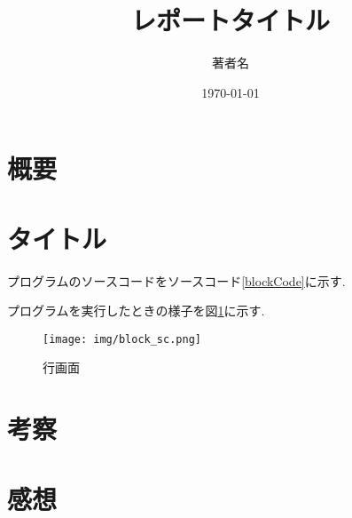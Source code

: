 \documentclass[mingoth]{jsarticle}
\title{レポートタイトル}
\author{著者名}
\date{\today}
\begin{document}
\maketitle

\section{概要}

\section{タイトル}
プログラムのソースコードをソースコード\ref{blockCode}に示す.


プログラムを実行したときの様子を図\ref{block_sc}に示す.
\begin{figure}[H]
	\centering
	\texttt{[image: img/block\_sc.png]}
	\caption{行画面}
	\label{block_sc}
\end{figure}

\section{考察}


\section{感想}



\end{document}

